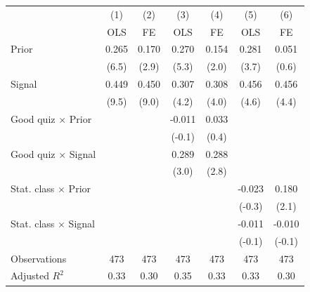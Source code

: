 \begin{tabular}{l*{6}{c}}
\hline\hline
                &\multicolumn{1}{c}{(1)}&\multicolumn{1}{c}{(2)}&\multicolumn{1}{c}{(3)}&\multicolumn{1}{c}{(4)}&\multicolumn{1}{c}{(5)}&\multicolumn{1}{c}{(6)}\\
                &\multicolumn{1}{c}{OLS}&\multicolumn{1}{c}{FE}&\multicolumn{1}{c}{OLS}&\multicolumn{1}{c}{FE}&\multicolumn{1}{c}{OLS}&\multicolumn{1}{c}{FE}\\
\hline
Prior           &    0.265\sym{***}&    0.170\sym{**} &    0.270\sym{***}&    0.154\sym{*}  &    0.281\sym{***}&    0.051         \\
                &    (6.5)         &    (2.9)         &    (5.3)         &    (2.0)         &    (3.7)         &    (0.6)         \\
Signal          &    0.449\sym{***}&    0.450\sym{***}&    0.307\sym{***}&    0.308\sym{***}&    0.456\sym{***}&    0.456\sym{***}\\
                &    (9.5)         &    (9.0)         &    (4.2)         &    (4.0)         &    (4.6)         &    (4.4)         \\
Good quiz $\times$ Prior&                  &                  &   -0.011         &    0.033         &                  &                  \\
                &                  &                  &   (-0.1)         &    (0.4)         &                  &                  \\
Good quiz $\times$ Signal&                  &                  &    0.289\sym{***}&    0.288\sym{**} &                  &                  \\
                &                  &                  &    (3.0)         &    (2.8)         &                  &                  \\
Stat. class $\times$ Prior&                  &                  &                  &                  &   -0.023         &    0.180\sym{*}  \\
                &                  &                  &                  &                  &   (-0.3)         &    (2.1)         \\
Stat. class $\times$ Signal&                  &                  &                  &                  &   -0.011         &   -0.010         \\
                &                  &                  &                  &                  &   (-0.1)         &   (-0.1)         \\
\hline
Observations    &      473         &      473         &      473         &      473         &      473         &      473         \\
Adjusted \(R^{2}\)&     0.33         &     0.30         &     0.35         &     0.33         &     0.33         &     0.30         \\
\hline\hline
\end{tabular}